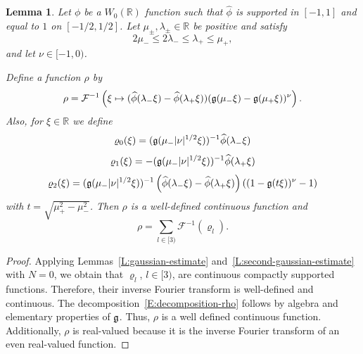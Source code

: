 \documentclass[12pt,reqno]{amsart}
\theoremstyle{plain}
\newtheorem{lemma}[theorem]{Lemma}
\numberwithin{equation}{section}
\theoremstyle{remark}
\newcommand{\using}[1]{}
\newcommand{\R}{{\mathbb R}}
\begin{document}
\begin{lemma}\label{L:gaussian-bump-decomposition}\using{L:gaussian-estimate}\using{L:second-gaussian-estimate}
Let $\phi$ be a $W_0(\R)$ function such that
$\widehat{\phi}$ is supported in $[-1,1]$ and equal to $1$ on $[-1/2,1/2]$.
Let $\mu_\pm,\lambda_\pm\in\mathbb R$ be positive and satisfy
\begin{equation}\label{E:assumption-on-mu-lambda}
2\mu_-\le 2\lambda_-\le \lambda_+\le \mu_+,
\end{equation}
and let $\nu\in [-1,0)$.

Define a function $\rho$ by
\begin{equation}\label{E:definition-rho}
\rho = \mathcal F^{-1}\left(\xi \mapsto (\widehat{\phi}(\lambda_-\xi) - \widehat{\phi}(\lambda_+\xi)) (\mathfrak{g}(\mu_- \xi)-\mathfrak{g}(\mu_+\xi))^{\nu}\right).
\end{equation}
Also, for $\xi \in \R$ we define
\begin{equation}\label{auto:four-scale-Gaussian-first-multiplier}
    \varrho_0(\xi)=(\mathfrak{g}(\mu_{-}|\nu|^{1/2}\xi))^{-1}\widehat{\phi}(\lambda_{-}\xi)
\end{equation}
\begin{equation}\label{auto:four-scale-Gaussian-second-multiplier}
    \varrho_1(\xi)=-(\mathfrak{g}(\mu_{-}|\nu|^{1/2}\xi))^{-1}\widehat{\phi}(\lambda_{+}\xi)
\end{equation}
\begin{equation}\label{auto:four-scale-Gaussian-remainder-multiplier}
    \varrho_2(\xi)=(\mathfrak{g}(\mu_{-}|\nu|^{1/2}\xi))^{-1}\left(\widehat{\phi}(\lambda_{-}\xi)-\widehat{\phi}(\lambda_{+}\xi)\right)\left((1-\mathfrak{g}(t\xi))^{\nu} -1\right)
\end{equation}
with $t=\sqrt{\mu_{+}^2-\mu_{-}^2}$.
Then $\rho$ is a well-defined continuous function and
\begin{equation}\label{E:decomposition-rho}
\rho=\sum_{l\in [3)} \mathcal F^{-1} (\varrho_l).
\end{equation}
\end{lemma}

\begin{proof}
Applying Lemmas~\ref{L:gaussian-estimate} and~\ref{L:second-gaussian-estimate} with $N=0$, we obtain that $\varrho_l$, $l\in [3)$, are continuous compactly supported functions. Therefore, their inverse Fourier transform is well-defined and continuous. The decomposition~\eqref{E:decomposition-rho} follows by algebra and elementary properties of $\mathfrak{g}$. Thus, $\rho$ is a well defined continuous function.
Additionally, $\rho$ is real-valued because it is the inverse Fourier transform of an even real-valued function.
\end{proof}
\end{document}
